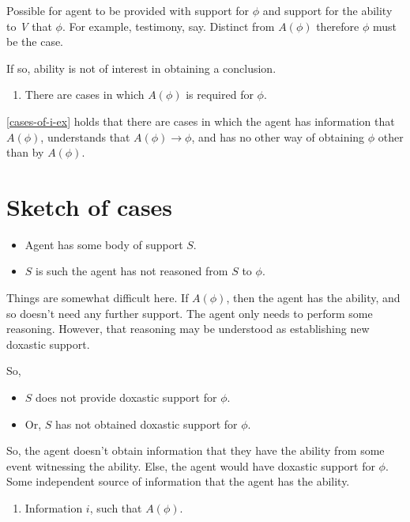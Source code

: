 \documentclass[10pt]{article}
\begin{document}
Possible for agent to be provided with support for \(\phi\) and support for the ability to \emph{V} that \(\phi\).
For example, testimony, say.
Distinct from \(A(\phi)\) therefore \(\phi\) must be the case.

If so, ability is not of interest in obtaining a conclusion.

\begin{enumerate}
\item\label{cases-of-i-ex} There are cases in which \(A(\phi)\) is required for \(\phi\).
\end{enumerate}

\ref{cases-of-i-ex} holds that there are cases in which the agent has information that \(A(\phi)\), understands that \(A(\phi) \rightarrow \phi\), and has no other way of obtaining \(\phi\) other than by \(A(\phi)\).


\section{Sketch of cases}
\label{sec:sketch-cases}

\begin{itemize}
\item Agent has some body of support \(S\).
\item \(S\) is such the agent has not reasoned from \(S\) to \(\phi\).
\end{itemize}

Things are somewhat difficult here.
If \(A(\phi)\), then the agent has the ability, and so doesn't need any further support.
The agent only needs to perform some reasoning.
However, that reasoning may be understood as establishing new doxastic support.

So,

\begin{itemize}
\item \(S\) does not provide doxastic support for \(\phi\).
\item Or, \(S\) has not obtained doxastic support for \(\phi\).
\end{itemize}

So, the agent doesn't obtain information that they have the ability from some event witnessing the ability.
Else, the agent would have doxastic support for \(\phi\).
Some independent source of information that the agent has the ability.

\begin{enumerate}
\item\label{abGen:i} Information \(i\), such that \(A(\phi)\).
\end{enumerate}
\end{document}
